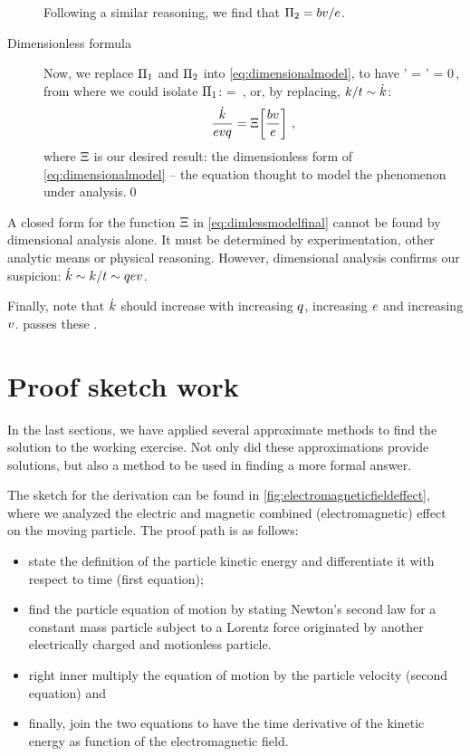 \begin{description}
Following a similar reasoning, we find that $\Pi_2 = bv/e$.
%
\item[Dimensionless formula] Now, we replace $\Pi_1$ and $\Pi_2$ into \cref{eq:dimensionalmodel}, to have
%
\beq
  \fdim' = \fdim' 
                               = 0\,,
\eeq
%
from where we could isolate $\Pi_1$:
%
\beq
   = \fdim\vat{\dfrac{\mfield\vel}{\efield}}\,,
\eeq
%
or, by replacing, $k/t\sim\dot{k}$:
%
\begin{equation}\label{eq:dimlessmodelfinal}
  \dfrac{\dot{k}}{evq} = \Xi\!\left[{\dfrac{bv}{e}}\right]\,,
\end{equation}
%
where $\Xi$ is our desired result: the dimensionless form of \cref{eq:dimensionalmodel} -- the equation thought to model the phenomenon under analysis.\qed
%
\end{description}
%
A closed form for the function $\Xi$ in \cref{eq:dimlessmodelfinal} cannot be found by dimensional analysis alone. It must be determined by experimentation, other analytic means or physical reasoning. However, dimensional analysis confirms our suspicion: $\dot{k}\sim k/t\sim qev$. 

Finally, note that $\dot{k}$ should increase with increasing $q$, increasing $e$ and increasing $v$.  passes these .


\section{Proof sketch work}
%
In the last sections, we have applied several approximate methods to find the solution to the working exercise. Not only did these approximations provide solutions, but also a method to be used in finding a more formal answer.

The sketch for the derivation can be found in \cref{fig:electromagneticfieldeffect}, where we analyzed the electric and magnetic combined (electromagnetic) effect on the moving particle. The proof path is as follows:
%
\begin{itemize}
%
\item state the definition of the particle kinetic energy and differentiate it with respect to time (first equation);
%
\item find the particle equation of motion by stating Newton's second law for a constant mass particle subject to a Lorentz force originated by another electrically charged and motionless particle.
%
\item right inner multiply the equation of motion by the particle velocity (second equation) and
%
\item finally, join the two equations to have the time derivative of the kinetic energy as function of the electromagnetic field.
%
\end{itemize}


